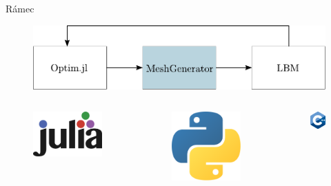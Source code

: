 \documentclass[aspectratio=169,xcolor=dvipsnames]{beamer}
\begin{document}
\begin{frame}{Rámec}
	\addtocounter{framenumber}{-1}
	\begin{figure}
		\includegraphics[width=0.9\linewidth, trim={0 -0.1cm 0 0}, clip]{Images/pipeline2.pdf}
	\end{figure}
	\vspace{-2mm}
	\begin{columns}[T] %
		\begin{column}{.31\textwidth}
			\begin{figure}
				\includegraphics[width=0.5\linewidth, trim={0 0 0 0}, clip]{Images/julia.png}
			\end{figure}
		\end{column}%
		\begin{column}{.31\textwidth}
			\begin{figure}
				\includegraphics[width=0.35\linewidth, trim={0 0 0 0cm}, clip]{Images/python.png}
			\end{figure}
		\end{column}%
		\begin{column}{.31\textwidth}
			\begin{figure}
				\includegraphics[width=0.35\linewidth, trim={0 0 0 0cm}, clip]{Images/cpp.png}
			\end{figure}
		\end{column}%
	\end{columns}
\end{frame}
\end{document}
